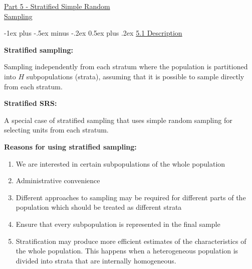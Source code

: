 \documentclass[10pt,landscape]{article}
\makeatletter
\renewcommand{\section}{\@startsection{section}{1}{0mm}%
                                {-1ex plus -.5ex minus -.2ex}%
                                {0.5ex plus .2ex}%
                                {\normalfont\large\bfseries}}
\makeatother
\begin{document}
\raggedright
\footnotesize
\begin{multicols}{3}


\setlength{\premulticols}{1pt}
\setlength{\postmulticols}{1pt}
\setlength{\multicolsep}{1pt}
\setlength{\columnsep}{2pt}

\begin{center}
     \Large{\underline{Part 5 - Stratified Simple Random}} \\
     \Large{\underline{Sampling}}
\end{center}

\section{\underline{5.1 Description}}

\textbf{Stratified sampling:}

Sampling independently from each stratum where the population is partitioned into $H$ subpopulations (strata), assuming that it is possible to sample directly from each stratum.

\textbf{Stratified SRS:}

A special case of stratified sampling that uses simple random sampling for selecting units from each stratum.

\textbf{Reasons for using stratified sampling:}
\begin{enumerate}
  \item We are interested in certain subpopulations of the whole population
  \item Administrative convenience
  \item Different approaches to sampling may be required for different parts of the population which should be treated as different strata
  \item Ensure that every subpopulation is represented in the final sample
  \item Stratification may produce more efficient estimates of the characteristics of the whole population. This happens when a heterogeneous population is divided into strata that are internally homogeneous.
\end{enumerate}


\end{multicols}
\end{document}
